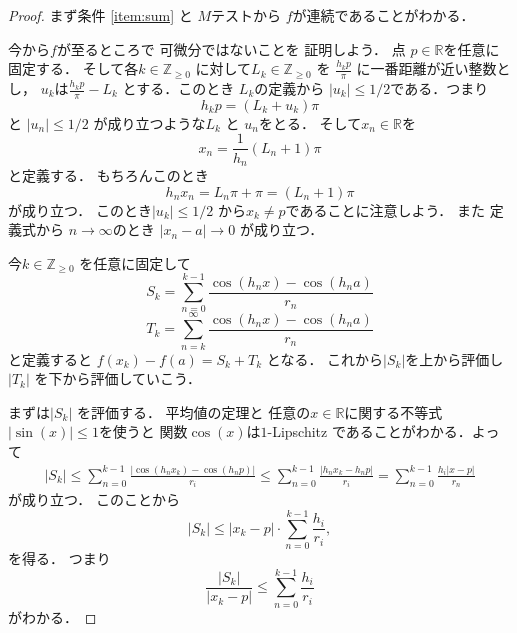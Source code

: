 \documentclass[leqno, a4paper, 12pt]{jsarticle}
\newcommand{\zz}{\mathbb{Z}}
\newcommand{\rr}{\mathbb{R}}
\begin{document}
\begin{proof}
まず条件
\ref{item:sum}
と
$M$テストから
$f$が連続であることがわかる．

今から$f$が至るところで
可微分ではないことを
証明しよう．
点
$p\in \rr$を任意に固定する．
そして各$k\in \zz_{\ge 0}$
に対して$L_{k}\in \zz_{\ge 0}$
を
$\frac{h_{k}p}{\pi}$
に一番距離が近い整数とし，
$u_{k}$は$\frac{h_{k}p}{\pi}-L_{k}$
とする．このとき
$L_{k}$の定義から
$|u_{k}|\le 1/2$である．つまり
\[
h_{k}p=(L_{k}+u_{k})\pi
\]
と
$|u_{n}|\le 1/2$
が成り立つような$L_{k}$
と
$u_{n}$をとる．
そして$x_{n}\in\rr$を
\[
x_{n}=\frac{1}{h_{n}}(L_{n}+1)\pi
\]
と定義する．
もちろんこのとき
\[
h_{n}x_{n}=L_{n}\pi +\pi=(L_{n}+1)\pi
\]
が成り立つ．
このとき$|u_{k}|\le 1/2$
から$x_{k}\neq p$であることに注意しよう．
また
定義式から
$n\to \infty$のとき
$|x_{n}-a|\to 0$
が成り立つ．

今$k\in \zz_{\ge 0}$
を任意に固定して
\[
S_{k}=\sum_{n=0}^{k-1}\frac{\cos(h_{n}x)-\cos(h_{n}a)}{r_{n}}
\]
\[
T_{k}=\sum_{n=k}^{\infty}
\frac{\cos(h_{n}x)-\cos(h_{n}a)}{r_{n}}
\]
と定義すると
$f(x_{k})-f(a)=S_{k}+T_{k}$
となる．
これから$|S_{k}|$を上から評価し
$|T_{k}|$
を下から評価していこう．

まずは$|S_{k}|$
を評価する．
平均値の定理と
任意の$x\in \rr$に関する不等式$|\sin(x)|\le 1$を使うと
関数$\cos(x)$は$1$-Lipschitz 
であることがわかる．よって
\begin{align*}
|S_{k}|\le 
\sum_{n=0}^{k-1}\frac{|\cos(h_{n}x_{k})-\cos(h_{n}p)|}{r_{i}} 
\le 
\sum_{n=0}^{k-1}\frac{|h_{n}x_{k}-h_{n}p|}{r_{i}} 
=
\sum_{n=0}^{k-1}\frac{h_{i}|x-p|}{r_{n}}
\end{align*}
が成り立つ．
このことから
\[
\left|S_{k}\right|
\le |x_{k}-p|\cdot \sum_{n=0}^{k-1}\frac{h_{i}}{r_{i}}, 
\]
を得る．
つまり
\[
\frac{\left|S_{k}\right|}{|x_{k}-p|}\le 
\sum_{n=0}^{k-1}\frac{h_{i}}{r_{i}}
\]
がわかる．



\end{proof}
\end{document}
